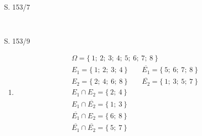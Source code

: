 \begin{Exercise}{S. 153/7}{}
\begin{enumerate}[leftmargin=*]
\begin{itemize}[leftmargin=*]
{\begin{minipage}[t]{0.35\linewidth}
{
                }\\
            \end{minipage}
            }
    \end{itemize}
\end{enumerate}
\end{Exercise}

\begin{Exercise}{S. 153/9}{}
\begin{enumerate}[leftmargin=*]
    \item [9.]{
        \vspace{-2.0ex}
        \begin{align*}
            &\Omega = \{ \ 1; \ 2; \ 3; \ 4; \ 5; \ 6; \ 7; \ 8 \ \} &\\
            &E_{1} = \{ \ 1; \ 2; \ 3; \ 4 \ \} \qquad \overline{E_{1}} = \{ \ 5; \ 6; \ 7; \ 8 \ \}\\
            &E_{2} = \{ \ 2; \ 4; \ 6; \ 8 \ \} \qquad \overline{E_{2}} = \{ \ 1; \ 3; \ 5; \ 7 \ \}\\[1.5ex]
            &E_{1} \cap E_{2} = \{ \ 2; \ 4 \ \} &&\\
            &E_{1} \cap \overline{E_{2}} = \{ \ 1; \ 3 \ \} &&\\
            &\overline{E_{1}} \cap E_{2} = \{ \ 6; \ 8 \ \} &&\\
            &\overline{E_{1}} \cap \overline{E_{2}} = \{ \ 5; \ 7 \ \} &&
        \end{align*}
    }
\end{enumerate}
\end{Exercise}

